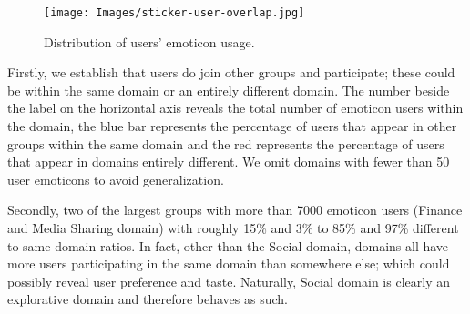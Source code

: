 \begin{figure}[htbp] 
    \centering \texttt{[image: Images/sticker-user-overlap.jpg]} 
    \caption{Distribution of users' emoticon usage.} 
\label{fig:emoticon-overlap-distribution} 
\end{figure}

Firstly, we establish that users do join other groups and participate; these could be within the same domain or an entirely different domain. The number beside the label on the horizontal axis reveals the total number of emoticon users within the domain, the blue bar represents the percentage of users that appear in other groups within the same domain and the red represents the percentage of users that appear in domains entirely different. We omit domains with fewer than 50 user emoticons to avoid generalization.

Secondly, two of the largest groups with more than 7000 emoticon users (Finance and Media Sharing domain) with roughly 15\% and 3\% to 85\% and 97\% different to same domain ratios. In fact, other than the Social domain, domains all have more users participating in the same domain than somewhere else; which could possibly reveal user preference and taste. Naturally, Social domain is clearly an explorative domain and therefore behaves as such.


